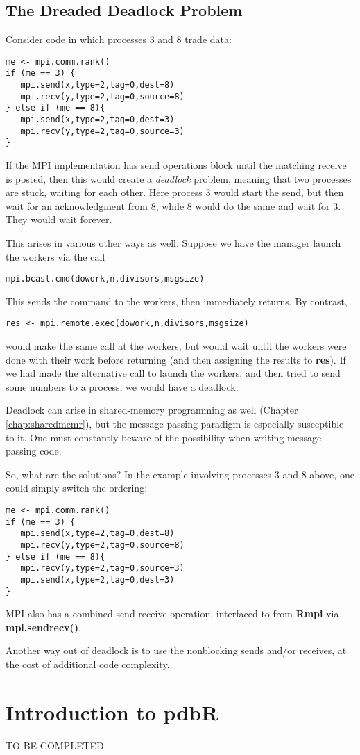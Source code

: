 \subsection{The Dreaded Deadlock Problem}
\label{deadlock}

Consider code in which processes 3 and 8 trade data:

\begin{lstlisting}
me <- mpi.comm.rank()
if (me == 3) {
   mpi.send(x,type=2,tag=0,dest=8)
   mpi.recv(y,type=2,tag=0,source=8)
} else if (me == 8){
   mpi.send(x,type=2,tag=0,dest=3)
   mpi.recv(y,type=2,tag=0,source=3)
}
\end{lstlisting}

If the MPI implementation has send operations block until
the matching receive is posted, then this would create a {\it deadlock}
problem, meaning that two processes are stuck, waiting for each
other.  Here process 3 would start the send, but then wait for an
acknowledgment from 8, while 8 would do the same and wait for 3.  They
would wait forever.

This arises in various other ways as well.  Suppose we have the manager
launch the workers via the call

\begin{lstlisting}
mpi.bcast.cmd(dowork,n,divisors,msgsize)
\end{lstlisting}

This sends the command to the workers, then immediately returns.  By
contrast,

\begin{lstlisting}
res <- mpi.remote.exec(dowork,n,divisors,msgsize)
\end{lstlisting}

would make the same call at the workers, but would wait until the
workers were done with their work before returning (and then assigning
the results to {\bf res}).  If we had made the alternative call to
launch the workers, and then tried to send some numbers to a process,
we would have a deadlock.

Deadlock can arise in shared-memory programming as well (Chapter
\ref{chap:sharedmemr}), but the message-passing paradigm is especially
susceptible to it.  One must constantly beware of the possibility when
writing message-passing code.

So, what are the solutions?  In the example involving processes 3 and 8
above, one could simply switch the ordering:

\begin{lstlisting}
me <- mpi.comm.rank()
if (me == 3) {
   mpi.send(x,type=2,tag=0,dest=8)
   mpi.recv(y,type=2,tag=0,source=8)
} else if (me == 8){
   mpi.recv(y,type=2,tag=0,source=3)
   mpi.send(x,type=2,tag=0,dest=3)
}
\end{lstlisting}

MPI also has a combined send-receive operation, interfaced to from {\bf
Rmpi} via {\bf mpi.sendrecv()}.

Another way out of deadlock is to use the nonblocking sends and/or
receives, at the cost of additional code complexity.

\section{Introduction to pdbR}

TO BE COMPLETED
